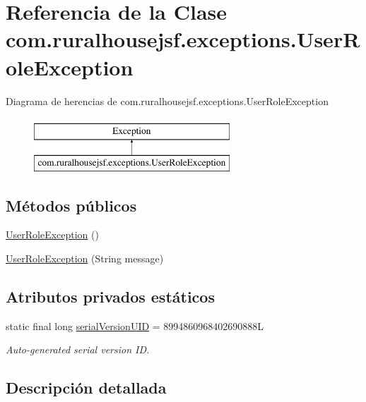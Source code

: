 \hypertarget{a00216}{}\section{Referencia de la Clase com.\+ruralhousejsf.\+exceptions.\+User\+Role\+Exception}
\label{a00216}
Diagrama de herencias de com.\+ruralhousejsf.\+exceptions.\+User\+Role\+Exception\begin{figure}[H]
\begin{center}
\leavevmode
\includegraphics[height=2.000000cm]{a00216}
\end{center}
\end{figure}
\subsection*{Métodos públicos}
\begin{DoxyCompactItemize}
\item 
\mbox{\hyperlink{a00216_a8ca96b595e439045ef33ddcea0c21da2}{User\+Role\+Exception}} ()
\item 
\mbox{\hyperlink{a00216_a7c888f23edf10f7c1347519b6d03752d}{User\+Role\+Exception}} (String message)
\end{DoxyCompactItemize}
\subsection*{Atributos privados estáticos}
\begin{DoxyCompactItemize}
\item 
static final long \mbox{\hyperlink{a00216_a9894bada17e7192af3bfcdd028fd6c57}{serial\+Version\+U\+ID}} = 8994860968402690888L
\begin{DoxyCompactList}\small\item\em Auto-\/generated serial version ID. \end{DoxyCompactList}\end{DoxyCompactItemize}


\subsection{Descripción detallada}


